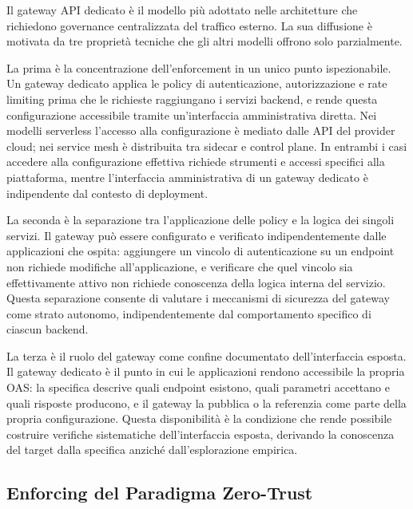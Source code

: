 Il gateway \gls{API} dedicato è il modello più adottato nelle architetture che richiedono governance centralizzata del traffico esterno. La sua diffusione è motivata da tre proprietà tecniche che gli altri modelli offrono solo parzialmente.

La prima è la concentrazione dell'enforcement in un unico punto ispezionabile. Un gateway dedicato applica le policy di autenticazione, autorizzazione e rate limiting prima che le richieste raggiungano i servizi backend, e rende questa configurazione accessibile tramite un'interfaccia amministrativa diretta. Nei modelli serverless l'accesso alla configurazione è mediato dalle API del provider cloud; nei service mesh è distribuita tra sidecar e control plane. In entrambi i casi accedere alla configurazione effettiva richiede strumenti e accessi specifici alla piattaforma, mentre l'interfaccia amministrativa di un gateway dedicato è indipendente dal contesto di deployment.

La seconda è la separazione tra l'applicazione delle policy e la logica dei singoli servizi. Il gateway può essere configurato e verificato indipendentemente dalle applicazioni che ospita: aggiungere un vincolo di autenticazione su un endpoint non richiede modifiche all'applicazione, e verificare che quel vincolo sia effettivamente attivo non richiede conoscenza della logica interna del servizio. Questa separazione consente di valutare i meccanismi di sicurezza del gateway come strato autonomo, indipendentemente dal comportamento specifico di ciascun backend.

La terza è il ruolo del gateway come confine documentato dell'interfaccia esposta. Il gateway dedicato è il punto in cui le applicazioni rendono accessibile la propria \gls{OAS}: la specifica descrive quali endpoint esistono, quali parametri accettano e quali risposte producono, e il gateway la pubblica o la referenzia come parte della propria configurazione. Questa disponibilità è la condizione che rende possibile costruire verifiche sistematiche dell'interfaccia esposta, derivando la conoscenza del target dalla specifica anziché dall'esplorazione empirica.


\subsection{Enforcing del Paradigma Zero-Trust}\label{subsec:zero-trust}


